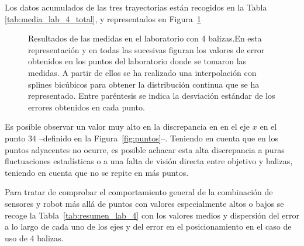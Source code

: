Los datos acumulados de las tres trayectorias están recogidos en la Tabla \ref{tab:media_lab_4_total}, y representados en Figura~\ref{fig:res_lab}
\begin{figure}[H]
    \centering
    
    \caption{Resultados de las medidas en el laboratorio con 4 balizas.\newline En esta representación y en todas las sucesivas figuran los valores de error obtenidos en los puntos del laboratorio donde se tomaron las medidas. A partir de ellos se ha realizado una interpolación con splines bicúbicos para obtener la distribución continua que se ha representado. \newline Entre paréntesis se indica la desviación estándar de los errores obtenidos en cada punto.}
    \label{fig:res_lab}
\end{figure}

Es posible observar un valor muy alto en la discrepancia en en el eje $x$ en el punto 34 --definido en la Figura~\ref{fig:puntos}--.
Teniendo en cuenta que en los puntos adyacentes no ocurre, es posible achacar esta alta discrepancia a puras fluctuaciones estadísticas o a una falta de visión directa entre objetivo y balizas, teniendo en cuenta que no se repite en más puntos.

Para tratar de comprobar el comportamiento general de la combinación de sensores y robot más allá de puntos con valores especialmente altos o bajos se recoge la Tabla~\ref{tab:resumen_lab_4} con los valores medios y dispersión del error a lo largo de cada uno de los ejes y del error en el posicionamiento en el caso de uso de 4 balizas.


